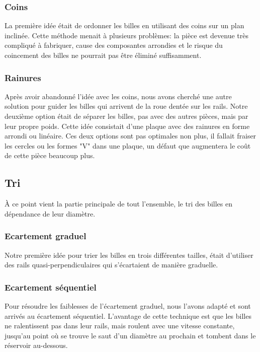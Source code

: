 \subsubsection{Coins}
La première idée était de ordonner les billes en utilisant des coins sur un plan inclinée. Cette méthode menait à plusieurs problèmes: la pièce est devenue très compliqué à fabriquer, cause des composantes arrondies et le risque du coincement des billes ne pourrait pas être éliminé suffisamment.


\subsubsection{Rainures}
Après avoir abandonné l'idée avec les coins, nous avons cherché une autre solution pour guider les billes qui arrivent de la roue dentée sur les rails. Notre deuxième option était de séparer les billes, pas avec des autres pièces, mais par leur propre poids. Cette idée consistait d'une plaque avec des rainures en forme arrondi ou linéaire. Ces deux options sont pas optimales non plus, il fallait fraiser les cercles ou les formes "V" dans une plaque, un défaut que augmentera le coût de cette pièce beaucoup plus.


\subsection{Tri}
À ce point vient la partie principale de tout l'ensemble, le tri des billes en dépendance de leur diamètre.

\subsubsection{Ecartement graduel}
Notre première idée pour trier les billes en trois différentes tailles, était d'utiliser des rails quasi-perpendiculaires qui s'écartaient de manière graduelle. 


\subsubsection{Ecartement séquentiel}
Pour résoudre les faiblesses de l'écartement graduel, nous l'avons adapté et sont arrivés au écartement séquentiel. L'avantage de cette technique est que les billes ne ralentissent pas dans leur rails, mais roulent avec une vitesse constante, jusqu'au point où se trouve le saut d'un diamètre au prochain et tombent dans le réservoir au-dessous.


